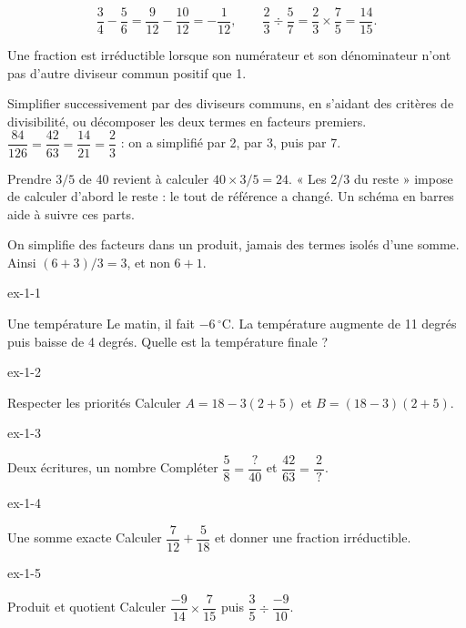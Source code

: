 \begin{exemple}
\[\frac34-\frac56=\frac9{12}-\frac{10}{12}=-\frac1{12},
\qquad \frac23\div\frac57=\frac23\times\frac75=\frac{14}{15}.\]
\end{exemple}
\begin{definition}Une fraction est irréductible lorsque son numérateur et son dénominateur n’ont pas d’autre diviseur commun positif que 1.\end{definition}
\begin{savoirfaire}Simplifier successivement par des diviseurs communs, en s’aidant des critères de divisibilité, ou décomposer les deux termes en facteurs premiers. $\dfrac{84}{126}=\dfrac{42}{63}=\dfrac{14}{21}=\dfrac23$ : on a simplifié par 2, par 3, puis par 7.\end{savoirfaire}
\begin{savoirfaire}Prendre $3/5$ de 40 revient à calculer $40\times3/5=24$. « Les $2/3$ du reste » impose de calculer d’abord le reste : le tout de référence a changé. Un schéma en barres aide à suivre ces parts.\end{savoirfaire}
\begin{attention}On simplifie des facteurs dans un produit, jamais des termes isolés d’une somme. Ainsi $(6+3)/3=3$, et non $6+1$.\end{attention}
\clearpage{}
\begin{blocLivre}{ex-1-1}\begin{exercice}[1]{Une température}
Le matin, il fait $-6\,^\circ$C. La température augmente de 11 degrés puis baisse de 4 degrés. Quelle est la température finale ?
\end{exercice}\end{blocLivre}
\begin{blocLivre}{ex-1-2}\begin{exercice}[1]{Respecter les priorités}
Calculer $A=18-3(2+5)$ et $B=(18-3)(2+5)$.
\end{exercice}\end{blocLivre}
\begin{blocLivre}{ex-1-3}\begin{exercice}[1]{Deux écritures, un nombre}
Compléter $\dfrac5{8}=\dfrac{\,?\,}{40}$ et $\dfrac{42}{63}=\dfrac2{\,?\,}$.
\end{exercice}\end{blocLivre}
\begin{blocLivre}{ex-1-4}\begin{exercice}[1]{Une somme exacte}
Calculer $\dfrac7{12}+\dfrac5{18}$ et donner une fraction irréductible.
\end{exercice}\end{blocLivre}
\begin{blocLivre}{ex-1-5}\begin{exercice}[1]{Produit et quotient}
Calculer $\dfrac{-9}{14}\times\dfrac7{15}$ puis $\dfrac35\div\dfrac{-9}{10}$.
\end{exercice}\end{blocLivre}

